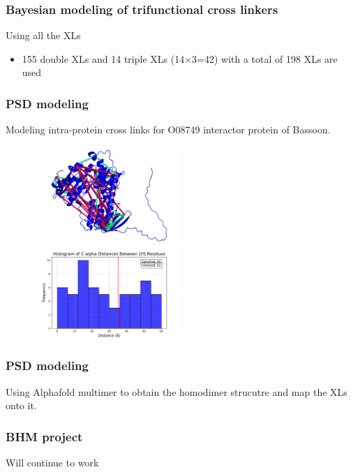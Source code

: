 \documentclass[a4paper,8pt]{beamer}
\begin{document}
\begin{frame}
  \frametitle{Bayesian modeling of trifunctional cross linkers}
  \begin{block}{Using all the XLs}
    \begin{itemize}
      \item 155 double XLs and 14 triple XLs (14$\times$3=42) with a 
      total of 198 XLs are used
    \end{itemize}
  \end{block}
  \end{frame}
%
\begin{frame}
\frametitle{PSD modeling}
Modeling intra-protein cross links for O08749 interactor protein of Bassoon. 
\begin{figure}
\centering
\includegraphics[width=0.5\textwidth]{figures/xls_mapped.png}
\includegraphics[width=0.5\textwidth]{figures/distances_O08749.pdf}
\end{figure}
\end{frame}
\begin{frame}
\frametitle{PSD modeling}
Using Alphafold multimer to obtain the homodimer strucutre and map the XLs onto it. 
\end{frame}
\begin{frame}
\frametitle{BHM project}
Will continue to work
\end{frame}
\end{document}
